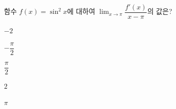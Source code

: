 함수 $f(x)=\sin^2 x$에 대하여 $\displaystyle\lim_{x\to\pi}\dfrac{f'(x)}{x-\pi}$의 값은?
\begin{choices32}{\rule[-3ex]{0pt}{8ex}$-2$}{\rule[-3ex]{0pt}{8ex}$-\dfrac{\pi}{2}$}{\rule[-3ex]{0pt}{8ex}$\dfrac{\pi}{2}$}{\rule[-3ex]{0pt}{8ex}$2$}{\rule[-3ex]{0pt}{8ex}$\pi$}\end{choices32}
